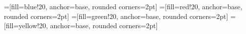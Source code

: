 =[fill=blue!20, anchor=base, rounded corners=2pt]
=[fill=red!20, anchor=base, rounded corners=2pt]
=[fill=green!20, anchor=base, rounded corners=2pt]
=[fill=yellow!20, anchor=base, rounded corners=2pt]

\newcommand{\CloudNote}[3]{
  \begin{tikzpicture}[overlay,remember picture, every text node part/.style={align=center}]
    \pgftransformshift{\pgfpointanchor{current page}{center}}
    \node[
    starburst,
    draw=black,
    ultra thick,
    fill=red,
    text width=#1,
    align=center,
    anchor=center
    ] at (#2) {#3};
  \end{tikzpicture}
}
